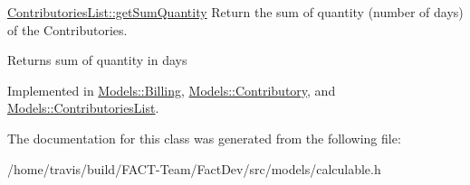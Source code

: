 \hyperlink{classModels_1_1ContributoriesList_af9b3b1b703cebeef552d058999ffcc4c}{Contributories\-List\-::get\-Sum\-Quantity} Return the sum of quantity (number of days) of the Contributories. 

\begin{DoxyReturn}{Returns}
sum of quantity in days 
\end{DoxyReturn}


Implemented in \hyperlink{classModels_1_1Billing_a360006189d4867e3281009b0c465bc53}{Models\-::\-Billing}, \hyperlink{classModels_1_1Contributory_aa6f3e9018846a83d192b8fb427fe0481}{Models\-::\-Contributory}, and \hyperlink{classModels_1_1ContributoriesList_af9b3b1b703cebeef552d058999ffcc4c}{Models\-::\-Contributories\-List}.



The documentation for this class was generated from the following file\-:\begin{DoxyCompactItemize}
\item 
/home/travis/build/\-F\-A\-C\-T-\/\-Team/\-Fact\-Dev/src/models/calculable.\-h\end{DoxyCompactItemize}
